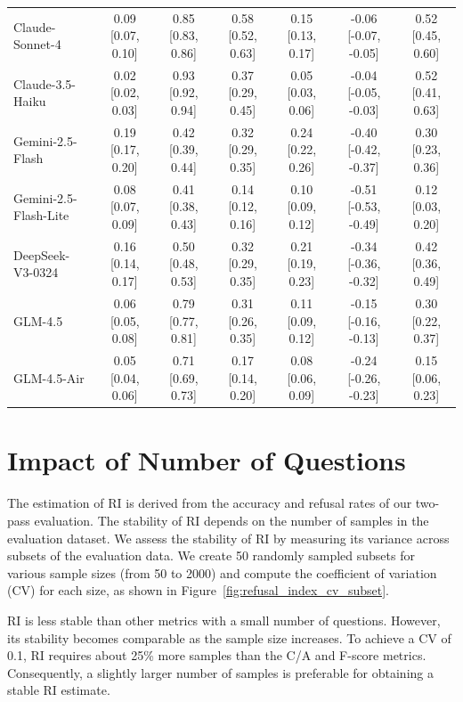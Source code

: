 \documentclass{article} %
\theoremstyle{definition}
\begin{document}
\begin{table}[h]
\begin{tabularx}{\textwidth}{X c c c c c c}
    Claude-Sonnet-4                & 0.09 [0.07, 0.10] & 0.85 [0.83, 0.86] & 0.58 [0.52, 0.63] & 0.15 [0.13, 0.17] & -0.06 [-0.07, -0.05] & 0.52 [0.45, 0.60] \\
    Claude-3.5-Haiku               & 0.02 [0.02, 0.03] & 0.93 [0.92, 0.94] & 0.37 [0.29, 0.45] & 0.05 [0.03, 0.06] & -0.04 [-0.05, -0.03] & 0.52 [0.41, 0.63] \\
    Gemini-2.5-Flash               & 0.19 [0.17, 0.20] & 0.42 [0.39, 0.44] & 0.32 [0.29, 0.35] & 0.24 [0.22, 0.26] & -0.40 [-0.42, -0.37] & 0.30 [0.23, 0.36] \\
    Gemini-2.5-Flash-Lite          & 0.08 [0.07, 0.09] & 0.41 [0.38, 0.43] & 0.14 [0.12, 0.16] & 0.10 [0.09, 0.12] & -0.51 [-0.53, -0.49] & 0.12 [0.03, 0.20] \\
    DeepSeek-V3-0324               & 0.16 [0.14, 0.17] & 0.50 [0.48, 0.53] & 0.32 [0.29, 0.35] & 0.21 [0.19, 0.23] & -0.34 [-0.36, -0.32] & 0.42 [0.36, 0.49] \\
    GLM-4.5                        & 0.06 [0.05, 0.08] & 0.79 [0.77, 0.81] & 0.31 [0.26, 0.35] & 0.11 [0.09, 0.12] & -0.15 [-0.16, -0.13] & 0.30 [0.22, 0.37] \\
    GLM-4.5-Air                    & 0.05 [0.04, 0.06] & 0.71 [0.69, 0.73] & 0.17 [0.14, 0.20] & 0.08 [0.06, 0.09] & -0.24 [-0.26, -0.23] & 0.15 [0.06, 0.23] \\
    \bottomrule
    \end{tabularx}
    \end{table}

\section{Impact of Number of Questions}
\label{sec:impact_of_number_of_questions}

The estimation of RI is derived from the accuracy and refusal rates of our two-pass evaluation. The stability of RI depends on the number of samples in the evaluation dataset. We assess the stability of RI by measuring its variance across subsets of the evaluation data. We create 50 randomly sampled subsets for various sample sizes (from 50 to 2000) and compute the coefficient of variation (CV) for each size, as shown in Figure~\ref{fig:refusal_index_cv_subset}.

RI is less stable than other metrics with a small number of questions. However, its stability becomes comparable as the sample size increases. To achieve a CV of 0.1, RI requires about \textcolor{green!60!black}{25\% more samples} than the C/A and F-score metrics. Consequently, a slightly larger number of samples is preferable for obtaining a stable RI estimate.
\end{document}
